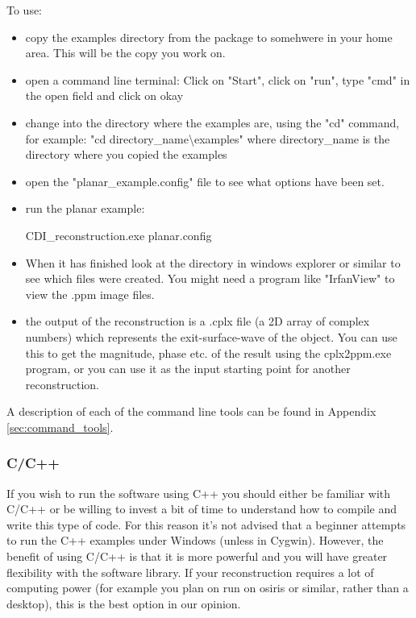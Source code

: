 \documentclass[]{cxs-software}
\begin{document}
To use:
\begin{itemize}
\item copy the examples directory from the package to somehwere in
  your home area. This will be the copy you work on.
\item open a command line terminal: Click on "Start", click on "run",
  type "cmd" in the open field and click on okay
\item change into the directory where the examples are, using the "cd"
  command, for example: "cd directory\_name\textbackslash examples" where
  directory\_name is the directory where you copied the examples
\item open the "planar\_example.config" file to see what options have
  been set.
\item run the planar example: 
  \begin{myverbatim}
    CDI_reconstruction.exe planar.config
  \end{myverbatim}
\item When it has finished look at the directory in windows explorer
  or similar to see which files were created. You might need a program
  like "IrfanView" to view the .ppm image files.
\item the output of the reconstruction is a .cplx file (a 2D array of
  complex numbers) which represents the exit-surface-wave of the
  object. You can use this to get the magnitude, phase etc. of the
  result using the cplx2ppm.exe program, or you can use it as the
  input starting point for another reconstruction.
\end{itemize}

A description of each of the command line tools can be found 
in Appendix \ref{sec:command_tools}.

\subsubsection{C/C++}

If you wish to run the software using C++ you should either be
familiar with C/C++ or be willing to invest a bit of time to
understand how to compile and write this type of code. For this reason
it's not advised that a beginner attempts to run the C++ examples
under Windows (unless in Cygwin). However, the benefit of using C/C++
is that it is more powerful and you will have greater flexibility with
the software library.  If your reconstruction requires a lot of
computing power (for example you plan on run on osiris or similar,
rather than a desktop), this is the best option in our opinion.
\end{document}
